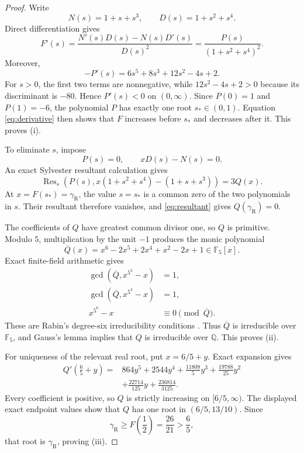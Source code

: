 \documentclass[11pt]{article}
\theoremstyle{remark}
\newcommand{\gR}{\gamma_{\mathrm R}}
\begin{document}
\begin{proof}
Write
\[
N(s)=1+s+s^3,
\qquad
D(s)=1+s^2+s^4.
\]
Direct differentiation gives
\begin{equation}\label{eq:derivative}
F'(s)=\frac{N'(s)D(s)-N(s)D'(s)}{D(s)^2}
=\frac{P(s)}{(1+s^2+s^4)^2}.
\end{equation}
Moreover,
\[
-P'(s)=6s^5+8s^3+12s^2-4s+2.
\]
For \(s>0\), the first two terms are nonnegative, while \(12s^2-4s+2>0\) because its discriminant is \(-80\). Hence \(P'(s)<0\) on \((0,\infty)\). Since \(P(0)=1\) and \(P(1)=-6\), the polynomial \(P\) has exactly one root \(s_*\in(0,1)\). Equation \eqref{eq:derivative} then shows that \(F\) increases before \(s_*\) and decreases after it. This proves (i).

To eliminate \(s\), impose
\[
P(s)=0,
\qquad
xD(s)-N(s)=0.
\]
An exact Sylvester resultant calculation gives
\begin{equation}\label{eq:resultant}
\operatorname{Res}_s\!\left(P(s),x(1+s^2+s^4)-(1+s+s^3)\right)=3Q(x).
\end{equation}
At \(x=F(s_*)=\gR\), the value \(s=s_*\) is a common zero of the two polynomials in \(s\). Their resultant therefore vanishes, and \eqref{eq:resultant} gives \(Q(\gR)=0\).

The coefficients of \(Q\) have greatest common divisor one, so \(Q\) is primitive. Modulo \(5\), multiplication by the unit \(-1\) produces the monic polynomial
\[
\overline Q(x)=x^6-2x^5+2x^4+x^2-2x+1\in\mathbb F_5[x].
\]
Exact finite-field arithmetic gives
\begin{align*}
\gcd\!\left(\overline Q,x^{5^2}-x\right)&=1,\\
\gcd\!\left(\overline Q,x^{5^3}-x\right)&=1,\\
x^{5^6}-x&\equiv0\pmod{\overline Q}.
\end{align*}
These are Rabin's degree-six irreducibility conditions \cite{Rabin1980}. Thus \(\overline Q\) is irreducible over \(\mathbb F_5\), and Gauss's lemma implies that \(Q\) is irreducible over \(\mathbb Q\). This proves (ii).

For uniqueness of the relevant real root, put \(x=6/5+y\). Exact expansion gives
\[
\begin{aligned}
Q'\!\left(\frac65+y\right)={}&864y^5+2544y^4+\frac{11808}{5}y^3
+\frac{19788}{25}y^2\\
&+\frac{22714}{125}y+\frac{236814}{3125}.
\end{aligned}
\]
Every coefficient is positive, so \(Q\) is strictly increasing on \([6/5,\infty)\). The displayed exact endpoint values show that \(Q\) has one root in \((6/5,13/10)\). Since
\[
\gR\geq F\!\left(\frac12\right)=\frac{26}{21}>\frac65,
\]
that root is \(\gR\), proving (iii).


\end{proof}
\end{document}
